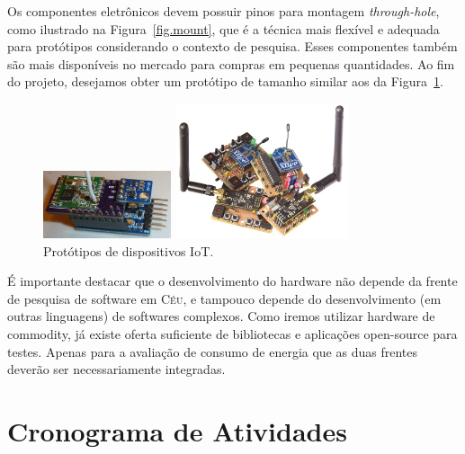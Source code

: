 \documentclass[titlepage,12pt]{article}
\newcommand{\CEU}{\textsc{C\'{e}u}\xspace}
\begin{document}
Os componentes eletrônicos devem possuir pinos para montagem
\emph{through-hole}, como ilustrado na Figura~\ref{fig.mount}, que é a técnica
mais flexível e adequada para protótipos considerando o contexto de pesquisa.
%
Esses componentes também são mais disponíveis no mercado para compras em
pequenas quantidades.
%
Ao fim do projeto, desejamos obter um protótipo de tamanho similar aos da
Figura~\ref{fig.protos}.

\begin{figure}
\begin{minipage}{0.50\textwidth}
\includegraphics[height=75px]{proto-01}
\end{minipage}
\begin{minipage}{0.50\textwidth}
\includegraphics[height=150px]{proto-03}
\end{minipage}
\caption{ Protótipos de dispositivos IoT. \label{fig.protos} }
\end{figure}

É importante destacar que o desenvolvimento do hardware não depende da frente
de pesquisa de software em \CEU, e tampouco depende do desenvolvimento (em
outras linguagens) de softwares complexos.
Como iremos utilizar hardware de commodity, já existe oferta suficiente de
bibliotecas e aplicações open-source para testes.
%
Apenas para a avaliação de consumo de energia que as duas frentes deverão ser
necessariamente integradas.


\section{ Cronograma de Atividades }
\end{document}
